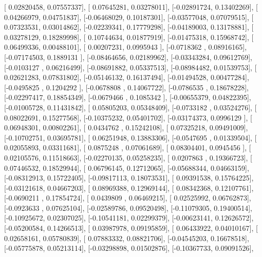 \documentclass{article}
\begin{document}
       [ 0.02820458,  0.07557337],
       [ 0.07645281,  0.03278011],
       [-0.02891724,  0.13402269],
       [ 0.04266979,  0.04751837],
       [-0.06468029,  0.10187301],
       [-0.03577048,  0.07079515],
       [ 0.07323531,  0.03014862],
       [-0.02239341,  0.17779298],
       [-0.04189003,  0.13178881],
       [ 0.03278129,  0.18289998],
       [ 0.10744634,  0.01877919],
       [-0.01475318,  0.15968742],
       [ 0.06499336,  0.00488101],
       [ 0.00207231,  0.0995943 ],
       [-0.0718362 ,  0.08916165],
       [-0.07174503,  0.1889131 ],
       [-0.08464656,  0.02189962],
       [-0.03343284,  0.09612769],
       [-0.0103127 ,  0.06216499],
       [-0.08691882,  0.05337513],
       [-0.08984482,  0.01539753],
       [ 0.02621283,  0.07831802],
       [-0.05146132,  0.16137494],
       [-0.01494528,  0.00477284],
       [-0.0495825 ,  0.1204292 ],
       [-0.0678808 ,  0.14067722],
       [-0.0786535 ,  0.18678228],
       [-0.02297417,  0.18854349],
       [-0.0679466 ,  0.1085342 ],
       [-0.00655379,  0.04822395],
       [-0.01005728,  0.11431842],
       [ 0.05805203,  0.05348409],
       [-0.0733182 ,  0.03524276],
       [ 0.08022691,  0.15277568],
       [-0.10375232,  0.05401702],
       [-0.03174373,  0.0996129 ],
       [ 0.06948301,  0.00802261],
       [ 0.0434762 ,  0.15242108],
       [ 0.07325218,  0.09491009],
       [-0.10702751,  0.03695781],
       [ 0.06251948,  0.13883306],
       [-0.0547695 ,  0.01339504],
       [ 0.02055893,  0.03311681],
       [ 0.0875248 ,  0.07061689],
       [ 0.08304401,  0.0945456 ],
       [ 0.02105576,  0.11518663],
       [-0.02270135,  0.05258235],
       [ 0.0207863 ,  0.19366723],
       [ 0.07446532,  0.18529944],
       [ 0.06796145,  0.12712065],
       [-0.05688344,  0.04663159],
       [-0.08312913,  0.15722405],
       [-0.09817113,  0.18073531],
       [ 0.09391538,  0.15764225],
       [-0.03121618,  0.04667203],
       [ 0.08969388,  0.12969144],
       [ 0.08342368,  0.12107761],
       [-0.0690211 ,  0.17854724],
       [ 0.0439809 ,  0.06469215],
       [ 0.02525992,  0.06762873],
       [-0.0923633 ,  0.07625104],
       [-0.02589786,  0.09520498],
       [-0.11079305,  0.19400514],
       [-0.10925672,  0.02307025],
       [-0.10541181,  0.02299379],
       [-0.00623141,  0.12626572],
       [-0.05200584,  0.14266513],
       [ 0.03987978,  0.09195859],
       [ 0.06433922,  0.04010167],
       [ 0.02658161,  0.05780839],
       [ 0.07883332,  0.08821706],
       [-0.04545203,  0.16678518],
       [-0.05775878,  0.05213114],
       [-0.03298898,  0.01502876],
       [-0.10367733,  0.09091526],
\end{document}
